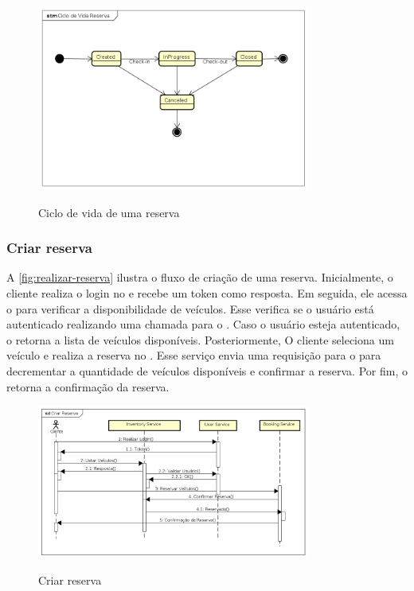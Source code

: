 \begin{figure}[H]
    \centering
    \caption{Ciclo de vida de uma reserva}
    \includegraphics[width=0.8\textwidth]{media/ciclo-reserva.png}
    \label{fig:ciclo-reserva}
\end{figure}

\subsubsection{Criar reserva}
A \autoref{fig:realizar-reserva} ilustra o fluxo de criação de uma reserva. Inicialmente, o cliente realiza o login no  e recebe um token como resposta. Em seguida, ele acessa o  para verificar a disponibilidade de veículos. Esse verifica se o usuário está autenticado realizando uma chamada para o . Caso o usuário esteja autenticado, o  retorna a lista de veículos disponíveis. Posteriormente, O cliente seleciona um veículo e realiza a reserva no . Esse serviço envia uma requisição para o  para decrementar a quantidade de veículos disponíveis e confirmar a reserva. Por fim, o  retorna a confirmação da reserva.

\begin{figure}[H]
    \centering
    \caption{Criar reserva}
    \includegraphics[width=0.8\textwidth]{media/criar-reserva.png}
    \label{fig:realizar-reserva}
\end{figure}


